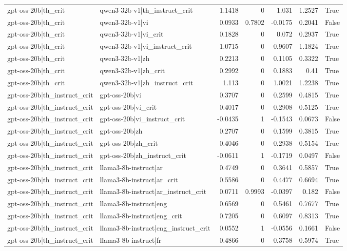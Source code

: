 \begin{table}
\begin{tabular}{l l r r r r l}
gpt-oss-20b|th_crit & qwen3-32b-v1|th_instruct_crit & 1.1418 & 0 & 1.031 & 1.2527 & True \\
gpt-oss-20b|th_crit & qwen3-32b-v1|vi & 0.0933 & 0.7802 & -0.0175 & 0.2041 & False \\
gpt-oss-20b|th_crit & qwen3-32b-v1|vi_crit & 0.1828 & 0 & 0.072 & 0.2937 & True \\
gpt-oss-20b|th_crit & qwen3-32b-v1|vi_instruct_crit & 1.0715 & 0 & 0.9607 & 1.1824 & True \\
gpt-oss-20b|th_crit & qwen3-32b-v1|zh & 0.2213 & 0 & 0.1105 & 0.3322 & True \\
gpt-oss-20b|th_crit & qwen3-32b-v1|zh_crit & 0.2992 & 0 & 0.1883 & 0.41 & True \\
gpt-oss-20b|th_crit & qwen3-32b-v1|zh_instruct_crit & 1.113 & 0 & 1.0021 & 1.2238 & True \\
gpt-oss-20b|th_instruct_crit & gpt-oss-20b|vi & 0.3707 & 0 & 0.2599 & 0.4815 & True \\
gpt-oss-20b|th_instruct_crit & gpt-oss-20b|vi_crit & 0.4017 & 0 & 0.2908 & 0.5125 & True \\
gpt-oss-20b|th_instruct_crit & gpt-oss-20b|vi_instruct_crit & -0.0435 & 1 & -0.1543 & 0.0673 & False \\
gpt-oss-20b|th_instruct_crit & gpt-oss-20b|zh & 0.2707 & 0 & 0.1599 & 0.3815 & True \\
gpt-oss-20b|th_instruct_crit & gpt-oss-20b|zh_crit & 0.4046 & 0 & 0.2938 & 0.5154 & True \\
gpt-oss-20b|th_instruct_crit & gpt-oss-20b|zh_instruct_crit & -0.0611 & 1 & -0.1719 & 0.0497 & False \\
gpt-oss-20b|th_instruct_crit & llama3-8b-instruct|ar & 0.4749 & 0 & 0.3641 & 0.5857 & True \\
gpt-oss-20b|th_instruct_crit & llama3-8b-instruct|ar_crit & 0.5586 & 0 & 0.4477 & 0.6694 & True \\
gpt-oss-20b|th_instruct_crit & llama3-8b-instruct|ar_instruct_crit & 0.0711 & 0.9993 & -0.0397 & 0.182 & False \\
gpt-oss-20b|th_instruct_crit & llama3-8b-instruct|eng & 0.6569 & 0 & 0.5461 & 0.7677 & True \\
gpt-oss-20b|th_instruct_crit & llama3-8b-instruct|eng_crit & 0.7205 & 0 & 0.6097 & 0.8313 & True \\
gpt-oss-20b|th_instruct_crit & llama3-8b-instruct|eng_instruct_crit & 0.0552 & 1 & -0.0556 & 0.1661 & False \\
gpt-oss-20b|th_instruct_crit & llama3-8b-instruct|fr & 0.4866 & 0 & 0.3758 & 0.5974 & True \\

\end{tabular}
\end{table}
